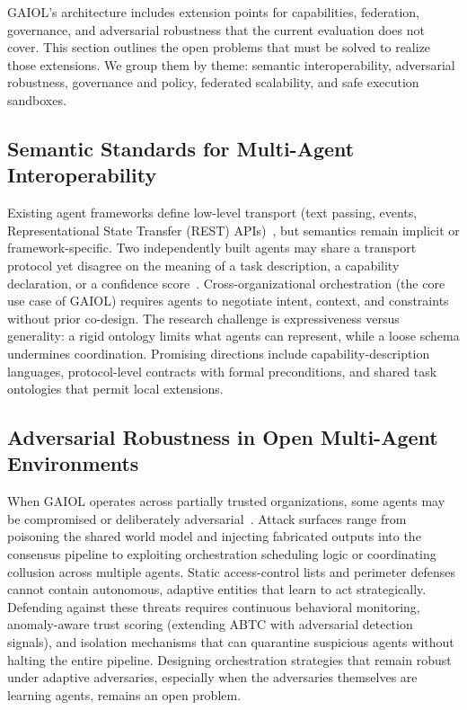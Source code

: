 \documentclass{iopjournal}
\begin{document}
GAIOL's architecture includes extension points for capabilities, federation, governance, and adversarial robustness that the current evaluation does not cover. This section outlines the open problems that must be solved to realize those extensions. We group them by theme: semantic interoperability, adversarial robustness, governance and policy, federated scalability, and safe execution sandboxes.

\subsection{Semantic Standards for Multi-Agent Interoperability}

Existing agent frameworks define low-level transport (text passing, events, Representational State Transfer (REST) APIs)~\cite{AutoGen, CAMEL, MetaGPT}, but semantics remain implicit or framework-specific. Two independently built agents may share a transport protocol yet disagree on the meaning of a task description, a capability declaration, or a confidence score~\cite{dong2024large}. Cross-organizational orchestration (the core use case of GAIOL) requires agents to negotiate intent, context, and constraints without prior co-design. The research challenge is expressiveness versus generality: a rigid ontology limits what agents can represent, while a loose schema undermines coordination. Promising directions include capability-description languages, protocol-level contracts with formal preconditions, and shared task ontologies that permit local extensions.

\subsection{Adversarial Robustness in Open Multi-Agent Environments}

When GAIOL operates across partially trusted organizations, some agents may be compromised or deliberately adversarial~\cite{Weidinger, RedTeaming}. Attack surfaces range from poisoning the shared world model and injecting fabricated outputs into the consensus pipeline to exploiting orchestration scheduling logic or coordinating collusion across multiple agents. Static access-control lists and perimeter defenses cannot contain autonomous, adaptive entities that learn to act strategically. Defending against these threats requires continuous behavioral monitoring, anomaly-aware trust scoring (extending ABTC with adversarial detection signals), and isolation mechanisms that can quarantine suspicious agents without halting the entire pipeline. Designing orchestration strategies that remain robust under adaptive adversaries, especially when the adversaries themselves are learning agents, remains an open problem.
\end{document}
